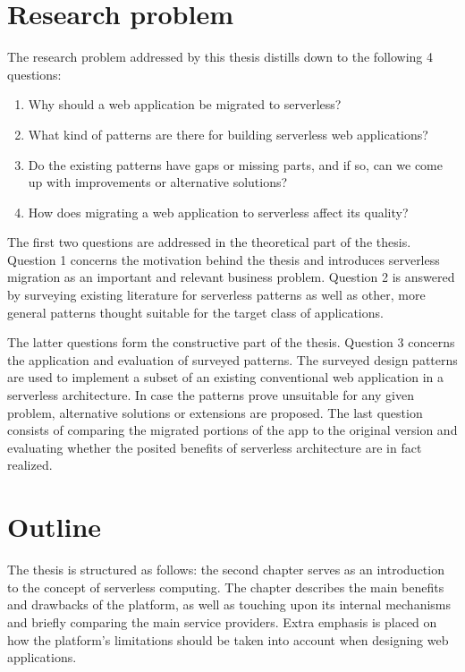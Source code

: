 \section{Research problem}

The research problem addressed by this thesis distills down to the following 4 questions:
\begin{enumerate}
	\item Why should a web application be migrated to serverless?
	\item What kind of patterns are there for building serverless web applications?
	\item Do the existing patterns have gaps or missing parts, and if so, can we come up with improvements or alternative solutions?
	\item How does migrating a web application to serverless affect its quality?
\end{enumerate}

The first two questions are addressed in the theoretical part of the thesis. Question 1 concerns the motivation behind the thesis and introduces serverless migration as an important and relevant business problem. Question 2 is answered by surveying existing literature for serverless patterns as well as other, more general patterns thought suitable for the target class of applications.

The latter questions form the constructive part of the thesis. Question 3 concerns the application and evaluation of surveyed patterns. The surveyed design patterns are used to implement a subset of an existing conventional web application in a serverless architecture. In case the patterns prove unsuitable for any given problem, alternative solutions or extensions are proposed. The last question consists of comparing the migrated portions of the app to the original version and evaluating whether the posited benefits of serverless architecture are in fact realized.

\section{Outline}

The thesis is structured as follows: the second chapter serves as an introduction to the concept of serverless computing. The chapter describes the main benefits and drawbacks of the platform, as well as touching upon its internal mechanisms and briefly comparing the main service providers. Extra emphasis is placed on how the platform's limitations should be taken into account when designing web applications.

